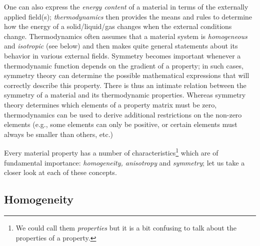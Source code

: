 One can also express the \textit{energy content} of a material in terms of the externally applied field(s); \textit{thermodynamics} then provides the means and rules to determine how the energy of a solid/liquid/gas changes when the external conditions change.  Thermodynamics often assumes that a material system is \textit{homogeneous} and \textit{isotropic} (see below) and then makes quite general statements about its behavior in various external fields.  Symmetry becomes important whenever a thermodynamic function depends on the gradient of a property; in such cases, symmetry theory can determine the possible mathematical expressions that will correctly describe this property.  There is thus an intimate relation between the symmetry of a material and its thermodynamic properties.  Whereas symmetry theory determines which elements of a property matrix must be zero, thermodynamics can be used to derive additional restrictions on the non-zero elements (e.g., some elements can only be positive, or certain elements must always be smaller than others, etc.)  

Every material property has a number of characteristics\footnote{We could call them \textit{properties} but it is a bit confusing to talk about the properties of a property.} which are of fundamental importance: \textit{homogeneity, anisotropy} and \textit{symmetry}; let us take a closer look at each of these concepts.

\subsection{Homogeneity}

